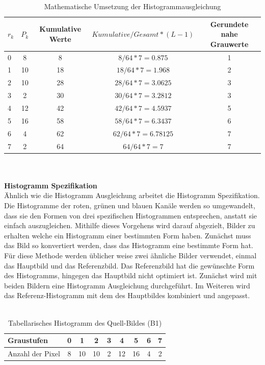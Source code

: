 \documentclass[a4paper,12pt,oneside]{article}
\begin{document}
  \begin{table}
  [h]
  \caption{Mathematische Umsetzung der Histogrammausgleichung}
  \centering
  \begin{tabular}{|l|c|c|c|c|}
  \hline
  $r_{k}$ & $P_{k}$ & Kumulative Werte & $Kumulative/Gesamt*(L-1)$ & Gerundete nahe Grauwerte\\
  \hline
  0 & 8 & 8 & $8/64*7=0.875$ & 1\\
  \hline
  1 & 10 & 18 & $18/64*7=1.968$ & 2\\
  \hline
  2 & 10 & 28 & $28/64*7=3.0625$ & 3\\
  \hline
  3 & 2 & 30 & $30/64*7=3.2812$ & 3\\
  \hline
  4 & 12 & 42 & $42/64*7=4.5937$ & 5\\
  \hline
  5 & 16 & 58 & $58/64*7=6.3437$ & 6\\
  \hline
  6 & 4 & 62 & $62/64*7=6.78125$ & 7\\
  \hline
  7 & 2 & 64 & $64/64*7=7$ & 7\\
  \hline
  \end{tabular}
  \end{table}\\\\
  \textbf{Histogramm Spezifikation}\label{s.hs}\\
  Ähnlich wie die Histogramm Ausgleichung arbeitet die Histogramm Spezifikation. Die Histogramme der roten, grünen und blauen Kanäle werden so umgewandelt, dass sie den Formen von drei spezifischen Histogrammen entsprechen, anstatt sie einfach auszugleichen. Mithilfe dieses Vorgehens wird darauf abgezielt, Bilder zu erhalten welche ein Histogramm einer bestimmten Form haben. Zunächst muss das Bild so konvertiert werden, dass das Histogramm eine bestimmte Form hat.
  Für diese Methode werden üblicher weise zwei ähnliche Bilder verwendet, einmal das Hauptbild und das Referenzbild. Das Referenzbild hat die gewünschte Form des Histogramms, hingegen das Hauptbild nicht optimiert ist. Zunächst wird mit beiden Bildern eine Histogramm Ausgleichung durchgeführt. Im Weiteren wird das Referenz-Histogramm mit dem des Hauptbildes kombiniert und angepasst.\\\\
  \begin{table}
  [h]
  \caption{Tabellarisches Histogramm des Quell-Bildes (B1)}
  \centering
  \begin{tabular}{|l|c|c|c|c|c|c|c|c|}
  \hline
  Graustufen & 0 & 1 & 2 & 3 & 4 & 5 & 6 & 7\\
  \hline
  Anzahl der Pixel & 8 & 10 & 10 & 2 & 12 & 16 & 4 & 2\\
  \hline
  \end{tabular}
  \end{table}\\
\end{document}
